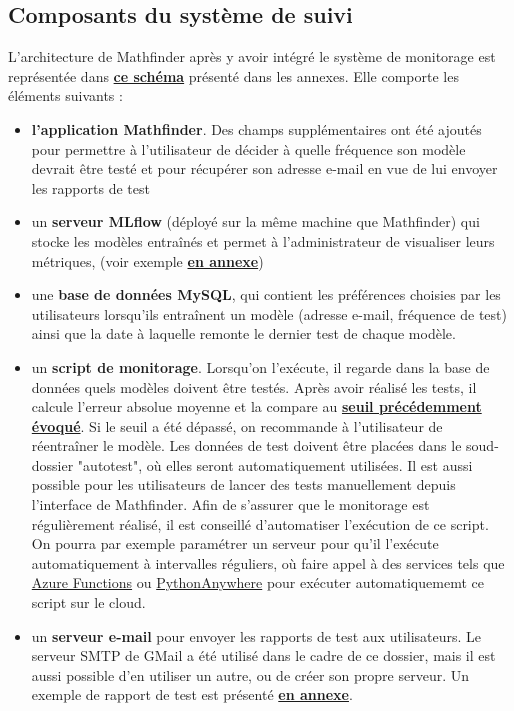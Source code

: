 \documentclass[french]{article}
\begin{document}
    \subsection{Composants du système de suivi}
    L'architecture de Mathfinder après y avoir intégré le système de monitorage est représentée dans \textbf{\hyperref[fig:architecture]{ce schéma}} présenté dans les annexes. Elle comporte les éléments suivants :
    \begin{itemize}
        \item \textbf{l'application Mathfinder}. Des champs supplémentaires ont été ajoutés pour permettre à l'utilisateur de décider à quelle fréquence son modèle devrait être testé et pour récupérer son adresse e-mail en vue de lui envoyer les rapports de test
        \item un \textbf{serveur MLflow} (déployé sur la même machine que Mathfinder) qui stocke les modèles entraînés et permet à l'administrateur de visualiser leurs métriques, (voir exemple \textbf{\hyperref[fig:mlflow]{en annexe}})
        \item une \textbf{base de données MySQL}, qui contient les préférences choisies par les utilisateurs lorsqu'ils entraînent un modèle (adresse e-mail, fréquence de test) ainsi que la date à laquelle remonte le dernier test de chaque modèle.
        \item un \textbf{script de monitorage}. Lorsqu'on l'exécute, il regarde dans la base de données quels modèles doivent être testés. Après avoir réalisé les tests, il calcule l'erreur absolue moyenne et la compare au \textbf{\hyperref[sec:metrics]{seuil précédemment évoqué}}. Si le seuil a été dépassé, on recommande à l'utilisateur de réentraîner le modèle. Les données de test doivent être placées dans le soud-dossier "autotest", où elles seront automatiquement utilisées. Il est aussi possible pour les utilisateurs de lancer des tests manuellement depuis l'interface de Mathfinder.
        Afin de s'assurer que le monitorage est régulièrement réalisé, il est conseillé d'automatiser l'exécution de ce script. On pourra par exemple paramétrer un serveur pour qu'il l'exécute automatiquement à intervalles réguliers, où faire appel à des services tels que \href{https://azure.microsoft.com/fr-fr/products/functions}{Azure Functions} ou \href{https://www.pythonanywhere.com/}{PythonAnywhere} pour exécuter automatiquememt ce script sur le cloud.
        \item un \textbf{serveur e-mail} pour envoyer les rapports de test aux utilisateurs. Le serveur SMTP de GMail a été utilisé dans le cadre de ce dossier, mais il est aussi possible d'en utiliser un autre, ou de créer son propre serveur. Un exemple de rapport de test est présenté \textbf{\hyperref[fig:email]{en annexe}}.
    \end{itemize}
\end{document}
